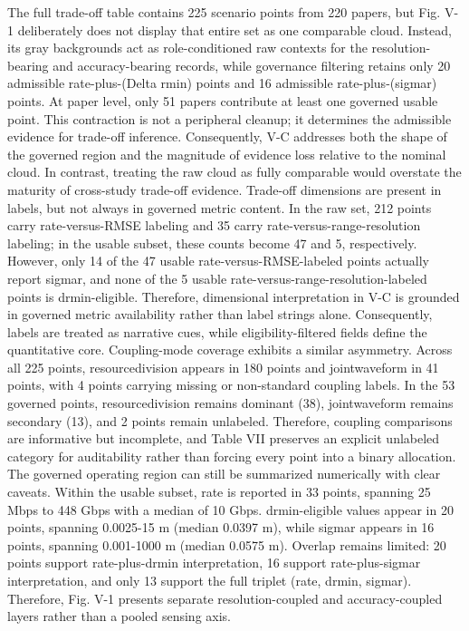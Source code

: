 {}The full trade-off table contains 225 scenario points from 220 papers, but Fig. V-1 deliberately does not display that entire set as one comparable cloud. Instead, its gray backgrounds act as role-conditioned raw contexts for the resolution-bearing and accuracy-bearing records, while governance filtering retains only 20 admissible rate-plus-(\markdownRendererBackslash{}Delta r\markdownRendererUnderscore{}\markdownRendererLeftBrace{}\markdownRendererBackslash{}min\markdownRendererRightBrace{}) points and 16 admissible rate-plus-(\markdownRendererBackslash{}sigma\markdownRendererUnderscore{}r) points. At paper level, only 51 papers contribute at least one governed usable point. This contraction is not a peripheral cleanup; it determines the admissible evidence for trade-off inference. Consequently, V-C addresses both the shape of the governed region and the magnitude of evidence loss relative to the nominal cloud. In contrast, treating the raw cloud as fully comparable would overstate the maturity of cross-study trade-off evidence.\markdownRendererParagraphSeparator
{}Trade-off dimensions are present in labels, but not always in governed metric content. In the raw set, 212 points carry rate-versus-RMSE labeling and 35 carry rate-versus-range-resolution labeling; in the usable subset, these counts become 47 and 5, respectively. However, only 14 of the 47 usable rate-versus-RMSE-labeled points actually report sigma\markdownRendererUnderscore{}r, and none of the 5 usable rate-versus-range-resolution-labeled points is drmin-eligible. Therefore, dimensional interpretation in V-C is grounded in governed metric availability rather than label strings alone. Consequently, labels are treated as narrative cues, while eligibility-filtered fields define the quantitative core.\markdownRendererParagraphSeparator
{}Coupling-mode coverage exhibits a similar asymmetry. Across all 225 points, resource\markdownRendererUnderscore{}division appears in 180 points and joint\markdownRendererUnderscore{}waveform in 41 points, with 4 points carrying missing or non-standard coupling labels. In the 53 governed points, resource\markdownRendererUnderscore{}division remains dominant (38), joint\markdownRendererUnderscore{}waveform remains secondary (13), and 2 points remain unlabeled. Therefore, coupling comparisons are informative but incomplete, and Table VII preserves an explicit unlabeled category for auditability rather than forcing every point into a binary allocation.\markdownRendererParagraphSeparator
{}The governed operating region can still be summarized numerically with clear caveats. Within the usable subset, rate is reported in 33 points, spanning 25 Mbps to 448 Gbps with a median of 10 Gbps. drmin-eligible values appear in 20 points, spanning 0.0025-15 m (median 0.0397 m), while sigma\markdownRendererUnderscore{}r appears in 16 points, spanning 0.001-1000 m (median 0.0575 m). Overlap remains limited: 20 points support rate-plus-drmin interpretation, 16 support rate-plus-sigma\markdownRendererUnderscore{}r interpretation, and only 13 support the full triplet (rate, drmin, sigma\markdownRendererUnderscore{}r). Therefore, Fig. V-1 presents separate resolution-coupled and accuracy-coupled layers rather than a pooled sensing axis.\markdownRendererParagraphSeparator
